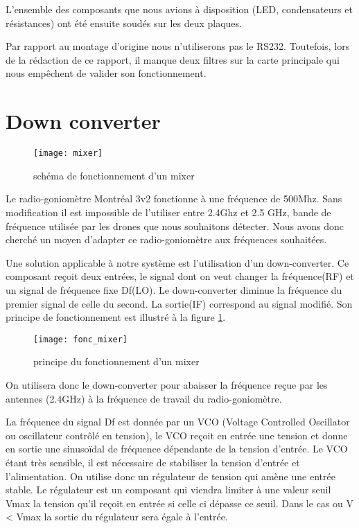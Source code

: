 L'ensemble des composants que nous avions à disposition (LED, condensateurs et résistances) ont été ensuite soudés sur les deux plaques. 

Par rapport au montage d'origine nous n'utiliserons pas le RS232. Toutefois, lors de la rédaction de ce rapport, il manque deux filtres sur la carte principale qui nous empêchent de valider son fonctionnement.


\section{Down converter}


\begin{wrapfigure}{r}{0.4\textwidth}
  
  \texttt{[image: mixer]}
  \caption{schéma de fonctionnement d'un mixer}
\end{wrapfigure}


Le radio-goniomètre Montréal 3v2 fonctionne à une fréquence de 500Mhz. Sans modification il est impossible de l’utiliser entre 2.4Ghz et 2.5 GHz, bande de fréquence utilisée par les drones que nous souhaitons détecter. Nous avons donc cherché un moyen d’adapter ce radio-goniomètre aux fréquences souhaitées.

Une solution applicable à notre système est l'utilisation d'un down-converter. Ce composant reçoit deux entrées, le signal dont on veut changer la fréquence(RF) et un signal de fréquence fixe Df(LO). Le down-converter diminue la fréquence du premier signal de celle du second. La sortie(IF) correspond au signal modifié. Son principe de fonctionnement est illustré à la figure \ref{fig:mix}.



\begin{figure}[h]
  \centering
  \texttt{[image: fonc\_mixer]}
  \caption{principe du fonctionnement d'un mixer}
  \label{fig:mix}
\end{figure}

On utilisera donc le down-converter pour abaisser la fréquence reçue par les antennes (2.4GHz) à la fréquence de travail du radio-goniomètre.

La fréquence du signal Df est donnée par un VCO (Voltage Controlled Oscillator ou oscillateur contrôlé en tension), le VCO reçoit en entrée une tension et donne en sortie une sinusoïdal de fréquence dépendante de la tension d’entrée. Le VCO étant très sensible, il est nécessaire de stabiliser la tension d’entrée et l’alimentation. On utilise donc un régulateur de tension qui amène une entrée stable. Le régulateur est un composant qui viendra limiter à une valeur seuil Vmax la tension qu'il reçoit en entrée si celle ci dépasse ce seuil. Dans le cas ou V < Vmax la sortie du régulateur sera égale à l'entrée.


